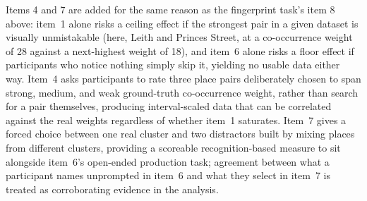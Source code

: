 \documentclass[logo,msc]{infthesis}
\begin{document}
Items 4 and 7 are added for the same reason as the fingerprint task's item 8 above: item~1 alone risks a ceiling effect if the strongest pair in a given dataset is visually unmistakable (here, Leith and Princes Street, at a co-occurrence weight of 28 against a next-highest weight of 18), and item~6 alone risks a floor effect if participants who notice nothing simply skip it, yielding no usable data either way. Item~4 asks participants to rate three place pairs deliberately chosen to span strong, medium, and weak ground-truth co-occurrence weight, rather than search for a pair themselves, producing interval-scaled data that can be correlated against the real weights regardless of whether item~1 saturates. Item~7 gives a forced choice between one real cluster and two distractors built by mixing places from different clusters, providing a scoreable recognition-based measure to sit alongside item~6's open-ended production task; agreement between what a participant names unprompted in item~6 and what they select in item~7 is treated as corroborating evidence in the analysis.
\end{document}
